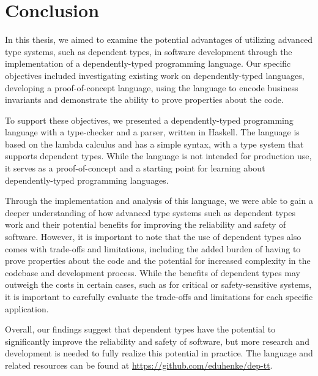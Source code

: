 \chapter{Conclusion}

In this thesis, we aimed to examine the potential advantages of utilizing advanced type systems, such as dependent types, in software development through the implementation of a dependently-typed programming language. Our specific objectives included investigating existing work on dependently-typed languages, developing a proof-of-concept language, using the language to encode business invariants and demonstrate the ability to prove properties about the code.

To support these objectives, we presented a dependently-typed programming language with a type-checker and a parser, written in Haskell. The language is based on the lambda calculus and has a simple syntax, with a type system that supports dependent types. While the language is not intended for production use, it serves as a proof-of-concept and a starting point for learning about dependently-typed programming languages.

Through the implementation and analysis of this language, we were able to gain a deeper understanding of how advanced type systems such as dependent types work and their potential benefits for improving the reliability and safety of software. However, it is important to note that the use of dependent types also comes with trade-offs and limitations, including the added burden of having to prove properties about the code and the potential for increased complexity in the codebase and development process. While the benefits of dependent types may outweigh the costs in certain cases, such as for critical or safety-sensitive systems, it is important to carefully evaluate the trade-offs and limitations for each specific application.

Overall, our findings suggest that dependent types have the potential to significantly improve the reliability and safety of software, but more research and development is needed to fully realize this potential in practice. The language and related resources can be found at \url{https://github.com/eduhenke/dep-tt}.
